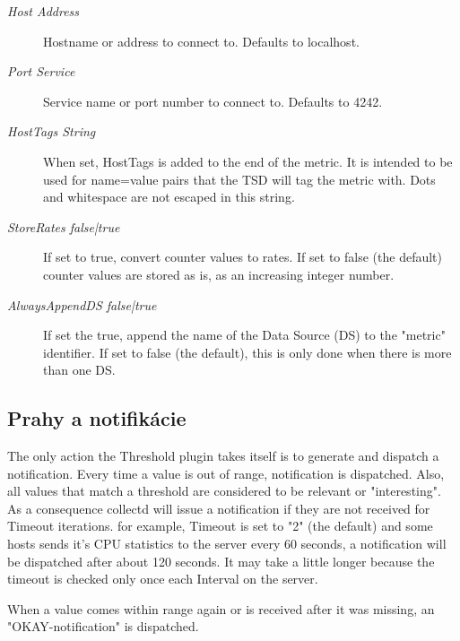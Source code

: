 \documentclass[11pt,final,oneside]{fithesis}
\begin{document}
\begin{description}
\item[\emph{Host Address}] Hostname or address to connect to. Defaults to localhost.
\item[\emph{Port Service}] Service name or port number to connect to. Defaults to 4242.
\item[\emph{HostTags String}] When set, HostTags is added to the end of the metric. It is intended to be used for name=value pairs that the TSD will tag the metric with. Dots and whitespace are not escaped in this string.
\item[\emph{StoreRates false|true}] If set to true, convert counter values to rates. If set to false (the default) counter values are stored as is, as an increasing integer number.
\item[\emph{AlwaysAppendDS false|true}] If set the true, append the name of the Data Source (DS) to the "metric" identifier. If set to false (the default), this is only done when there is more than one DS.
\end{description}

\subsection{Prahy a notifikácie}

The only action the Threshold plugin takes itself is to generate and dispatch a notification. Every time a value is out of range, 
notification is dispatched. 
Also, all values that match a threshold are considered to be relevant or "interesting". As a consequence collectd will issue a notification 
if they are not received for Timeout iterations.  for example, Timeout is set to "2" (the default) and some hosts sends it's CPU statistics to the server every 60 seconds, a notification will be dispatched after about 120 seconds. It may take a little longer because the timeout is checked only once each Interval on the server.

When a value comes within range again or is received after it was missing, an "OKAY-notification" is dispatched.
\cite{14}
\end{document}

